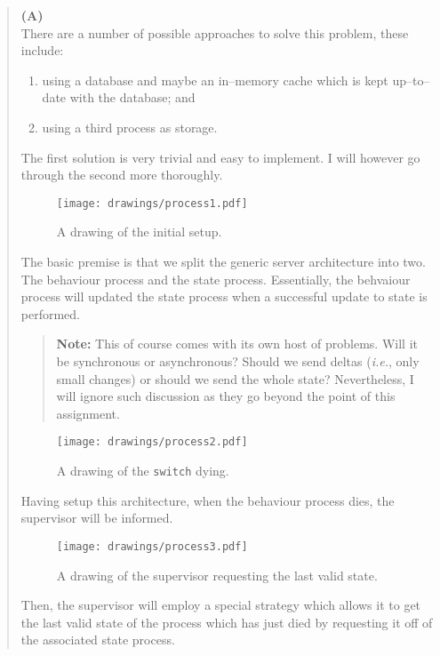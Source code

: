 \documentclass{article}
\newenvironment{ans}
    {\begin{quote}{\large\textbf{(A)}}\\\vspace{5pt}}
    {\end{quote}}
\begin{document}
\begin{ans}
There are a number of possible approaches to solve this problem,
these include:

\begin{enumerate}
  \item using a database and maybe an in--memory cache which is
    kept up--to--date with the database; and
  \item using a third process as storage.
\end{enumerate}

The first solution is very trivial and easy to implement. I will
however go through the second more thoroughly.

\begin{figure}[H]
  \centering
  \texttt{[image: drawings/process1.pdf]}
  \caption{A drawing of the initial setup.}
\end{figure}

The basic premise is that we split the generic server
architecture into two. The behaviour process and the state
process. Essentially, the behvaiour process will updated the
state process when a successful update to state is performed.

\begin{quote}
  \textbf{Note:} This of course comes with its own host of
  problems. Will it be synchronous or asynchronous? Should we
  send deltas (\emph{i.e.}, only small changes) or should we
  send the whole state? Nevertheless, I will ignore such
  discussion as they go beyond the point of this assignment.
\end{quote}

\begin{figure}[H]
  \centering
  \texttt{[image: drawings/process2.pdf]}
  \caption{A drawing of the \texttt{switch} dying.}
\end{figure}

Having setup this architecture, when the behaviour process dies,
the supervisor will be informed.

\begin{figure}[H]
  \centering
  \texttt{[image: drawings/process3.pdf]}
  \caption{A drawing of the supervisor requesting the last valid
  state.}
\end{figure}

Then, the supervisor will employ a special strategy which allows
it to get the last valid state of the process which has just
died by requesting it off of the associated state process.


\end{ans}
\end{document}
